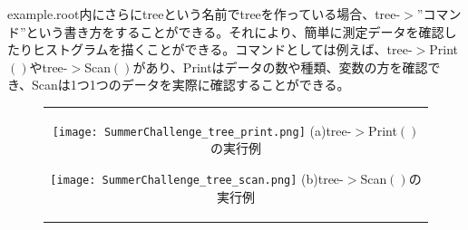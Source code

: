 \documentclass[uplatex,10pt,a4j]{jsarticle}
\begin{document}
example.root内にさらにtreeという名前でtreeを作っている場合、tree-$>$''コマンド''という書き方をすることができる。それにより、簡単に測定データを確認したりヒストグラムを描くことができる。コマンドとしては例えば、tree-$>$Print$\left(\right)$やtree-$>$Scan$\left(\right)$があり、Printはデータの数や種類、変数の方を確認でき、Scanは1つ1つのデータを実際に確認することができる。
\begin{figure}[htbp]
  \begin{center}
    \begin{tabular}{c}

      \begin{minipage}{0.5\hsize}
        \begin{center}
          \texttt{[image: SummerChallenge\_tree\_print.png]}
          \hspace{1.6cm} (a)tree-$>$Print$\left(\right)$の実行例
        \end{center}
      \end{minipage}

      \begin{minipage}{0.5\hsize}
        \begin{center}
          \texttt{[image: SummerChallenge\_tree\_scan.png]}
          \hspace{1.6cm} (b)tree-$>$Scan$\left(\right)$の実行例
        \end{center}
      \end{minipage}
    \end{tabular}
  \end{center}
\end{figure}
\end{document}
